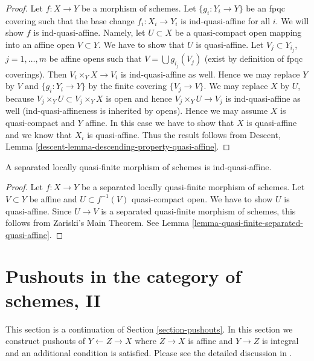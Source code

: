 \begin{proof}
Let $f : X \to Y$ be a morphism of schemes. Let $\{g_i : Y_i \to Y\}$
be an fpqc covering such that the base change $f_i : X_i \to Y_i$
is ind-quasi-affine for all $i$. We will show $f$ is ind-quasi-affine.
Namely, let $U \subset X$ be a quasi-compact open mapping into
an affine open $V \subset Y$. We have to show that $U$ is quasi-affine.
Let $V_j \subset Y_{i_j}$, $j = 1, \ldots, m$ be affine opens
such that $V = \bigcup g_{i_j}(V_j)$ (exist by definition of
fpqc coverings). Then $V_i \times_Y X \to V_i$ is ind-quasi-affine
as well. Hence we may replace $Y$ by $V$ and $\{g_i : Y_i \to Y\}$
by the finite covering $\{V_j \to V\}$. We may replace $X$ by
$U$, because $V_j \times_Y U \subset V_j \times_Y X$ is open and
hence $V_j \times_Y U \to V_j$ is ind-quasi-affine as well
(ind-quasi-affineness is inherited by opens).
Hence we may assume $X$ is quasi-compact and $Y$ affine.
In this case we have to show that $X$ is quasi-affine and we
know that $X_i$ is quasi-affine. Thus the result follows from
Descent, Lemma \ref{descent-lemma-descending-property-quasi-affine}.
\end{proof}

\begin{lemma}
\label{lemma-etale-separated-ind-quasi-affine}
A separated locally quasi-finite morphism of schemes is ind-quasi-affine.
\end{lemma}

\begin{proof}
Let $f : X \to Y$ be a separated locally quasi-finite morphism of schemes.
Let $V \subset Y$ be affine and $U \subset f^{-1}(V)$ quasi-compact
open. We have to show $U$ is quasi-affine. Since $U \to V$ is a
separated quasi-finite morphism of schemes, this follows from
Zariski's Main Theorem. See
Lemma \ref{lemma-quasi-finite-separated-quasi-affine}.
\end{proof}




\section{Pushouts in the category of schemes, II}
\label{section-pushouts-II}

\noindent
This section is a continuation of Section \ref{section-pushouts}.
In this section we construct pushouts of $Y \leftarrow Z \rightarrow X$
where $Z \to X$ is affine and $Y \to Z$ is integral and an additional
condition is satisfied.
Please see the detailed discussion in \cite{Ferrand-Conducteur}.

